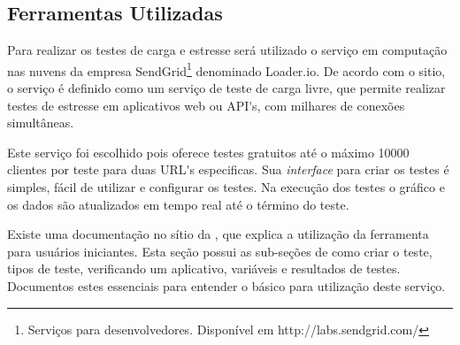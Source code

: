 





\subsection{Ferramentas Utilizadas}
\label{ferramentas-utilizadas-para-testes}
  
  Para realizar os testes de carga e estresse será utilizado o serviço em computação nas nuvens
  da empresa SendGrid\footnote[8]{Serviços para desenvolvedores. Disponível em http://labs.sendgrid.com/} denominado Loader.io.
  De acordo com o sitio, o serviço é definido como um serviço de teste de carga livre,
  que permite realizar testes de estresse em aplicativos web ou API\'{}s, com milhares de conexões simultâneas.
  
  Este serviço foi escolhido pois oferece testes gratuitos até o máximo 10000 clientes por teste para duas 
  URL\'{}s especificas. Sua \textit{interface} para criar os testes é simples, fácil de utilizar e
  configurar os testes. Na execução dos testes o gráfico e os dados são atualizados em tempo real até o 
  término do teste.
  
  Existe uma documentação no sítio da , que explica a utilização da ferramenta para usuários
  iniciantes. Esta seção possui as sub-seções de como criar o teste, tipos de teste,
  verificando um aplicativo, variáveis e resultados de testes. Documentos estes essenciais para 
  entender o básico para utilização deste serviço. 
  